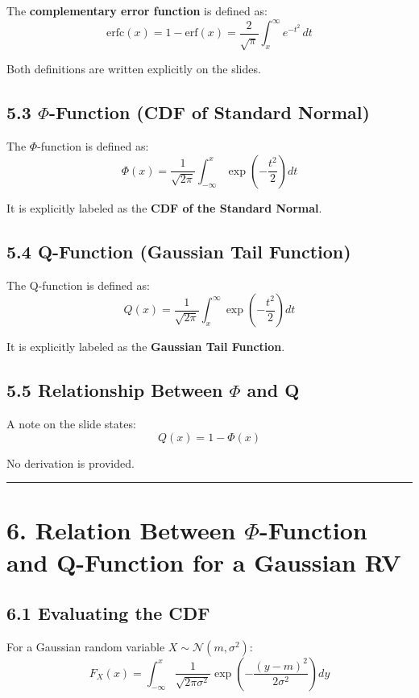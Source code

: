 \documentclass[12pt]{article}
\begin{document}
The \textbf{complementary error function} is defined as:
\[
\mathrm{erfc}(x)
= 1 - \mathrm{erf}(x)
=
\frac{2}{\sqrt{\pi}}
\int_x^{\infty} e^{-t^2}\, dt
\]

Both definitions are written explicitly on the slides.

\subsection*{5.3 $\Phi$-Function (CDF of Standard Normal)}

The $\Phi$-function is defined as:
\[
\Phi(x) =
\frac{1}{\sqrt{2\pi}}
\int_{-\infty}^{x}
\exp\!\left(-\frac{t^2}{2}\right) dt
\]

It is explicitly labeled as the \textbf{CDF of the Standard Normal}.

\subsection*{5.4 Q-Function (Gaussian Tail Function)}

The Q-function is defined as:
\[
Q(x) =
\frac{1}{\sqrt{2\pi}}
\int_x^{\infty}
\exp\!\left(-\frac{t^2}{2}\right) dt
\]

It is explicitly labeled as the \textbf{Gaussian Tail Function}.

\subsection*{5.5 Relationship Between $\Phi$ and Q}

A note on the slide states:
\[
Q(x) = 1 - \Phi(x)
\]

No derivation is provided.

\hrule
\vspace{1em}

\section*{6. Relation Between $\Phi$-Function and Q-Function for a Gaussian RV}

\subsection*{6.1 Evaluating the CDF}

For a Gaussian random variable $X \sim \mathcal{N}(m,\sigma^2)$:
\[
F_X(x) =
\int_{-\infty}^{x}
\frac{1}{\sqrt{2\pi\sigma^2}}
\exp\!\left(
-\frac{(y - m)^2}{2\sigma^2}
\right) dy
\]
\end{document}
